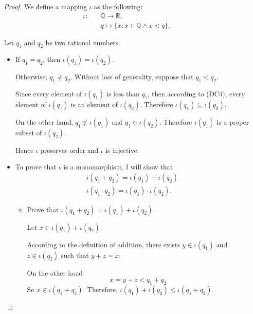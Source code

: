 \begin{proof}
    We define a mapping $\iota$ as the following:
    \[
        \begin{split}
            \iota:\quad & \mathbb{Q}\to\mathbb{R}, \\
            & q\mapsto \{ x : x\in\mathbb{Q}\land x < q \}.
        \end{split}
    \]

    Let $q_{1}$ and $q_{2}$ be two rational numbers.
    \begin{itemize}
        \item If $q_{1} = q_{2}$, then $\iota(q_{1}) = \iota(q_{2})$.

              Otherwise, $q_{1}\ne q_{2}$. Without loss of generality, suppose that $q_{1} < q_{2}$.

              Since every element of $\iota(q_{1})$ is less than $q_{1}$, then according to (DC4), every element of $\iota(q_{1})$ is an element of $\iota(q_{2})$. Therefore $\iota(q_{1})\subseteq\iota(q_{2})$.

              On the other hand, $q_{1}\notin\iota(q_{1})$ and $q_{1}\in\iota(q_{2})$. Therefore $\iota(q_{1})$ is a proper subset of $\iota(q_{2})$.

              Hence $\iota$ preserves order and $\iota$ is injective.
        \item To prove that $\iota$ is a monomorphism, I will show that
              \[
                  \begin{split}
                      \iota(q_{1} + q_{2}) = \iota(q_{1}) + \iota(q_{2}) \\
                      \iota(q_{1}\cdot q_{2}) = \iota(q_{1})\cdot\iota(q_{2}).
                  \end{split}
              \]
              \begin{itemize}
                  \item Prove that $\iota(q_{1} + q_{2}) = \iota(q_{1}) + \iota(q_{2})$.

                        Let $x\in\iota(q_{1}) + \iota(q_{2})$.

                        According to the definition of addition, there exists $y\in\iota(q_{1})$ and $z\in\iota(q_{2})$ such that $y + z = x$.

                        On the other hand
                        \[
                            x = y + z < q_{1} + q_{2}
                        \]
                        So $x\in\iota(q_{1} + q_{2})$. Therefore, $\iota(q_{1}) + \iota(q_{2})\le\iota(q_{1} + q_{2})$.
                        \bigskip


\end{itemize}
\end{itemize}
\end{proof}
